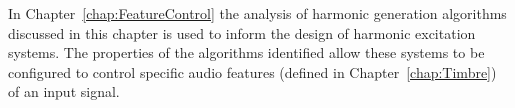 	In Chapter~\ref{chap:FeatureControl} the analysis of harmonic generation algorithms discussed in this chapter is
	used to inform the design of harmonic excitation systems. The properties of the algorithms identified allow these
	systems to be configured to control specific audio features (defined in Chapter~\ref{chap:Timbre}) of an input
	signal.
